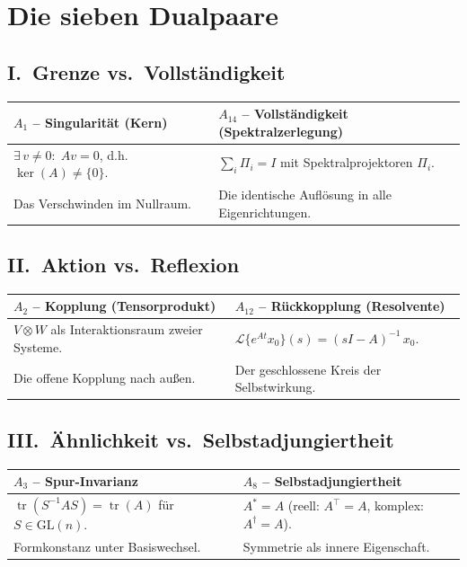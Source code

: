 \documentclass[11pt,a4paper]{article}
\newcommand{\tr}{\operatorname{tr}}
\newcommand{\T}{^{\!\top}}
\newcommand{\adj}{^{\ast}}
\begin{document}
\bigskip
\section*{Die sieben Dualpaare}

\subsection*{I.\ Grenze vs.\ Vollständigkeit}
\begin{tabular}{@{}LL@{}}
  \toprule
  \textbf{$A_1$ -- Singularität (Kern)} &
  \textbf{$A_{14}$ -- Vollständigkeit (Spektralzerlegung)} \\
  \midrule
  $\exists\, v\neq 0:\; A v = 0$, d.h.\ $\ker(A)\neq\{0\}$. &
  $\displaystyle \sum_i \Pi_i = I$ mit Spektralprojektoren $\Pi_i$. \\
  Das Verschwinden im Nullraum. &
  Die identische Auflösung in alle Eigenrichtungen. \\
  \bottomrule
\end{tabular}

\subsection*{II.\ Aktion vs.\ Reflexion}
\begin{tabular}{@{}LL@{}}
  \toprule
  \textbf{$A_2$ -- Kopplung (Tensorprodukt)} &
  \textbf{$A_{12}$ -- Rückkopplung (Resolvente)} \\
  \midrule
  $V\otimes W$ als Interaktionsraum zweier Systeme. &
  $\mathcal{L}\{e^{At} x_0\}(s) = (sI-A)^{-1}\, x_0$. \\
  Die offene Kopplung nach außen. &
  Der geschlossene Kreis der Selbstwirkung. \\
  \bottomrule
\end{tabular}

\subsection*{III.\ Ähnlichkeit vs.\ Selbstadjungiertheit}
\begin{tabular}{@{}LL@{}}
  \toprule
  \textbf{$A_3$ -- Spur-Invarianz} &
  \textbf{$A_8$ -- Selbstadjungiertheit} \\
  \midrule
  $\tr(S^{-1} A S) = \tr(A)$ für $S\in\mathrm{GL}(n)$. &
  $A\adj = A$ \quad
    (reell: $A\T = A$, komplex: $A^{\dagger} = A$). \\
  Formkonstanz unter Basiswechsel. &
  Symmetrie als innere Eigenschaft. \\
  \bottomrule
\end{tabular}
\end{document}
